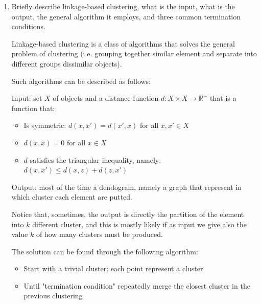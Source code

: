 \documentclass[a4paper,11pt,oneside]{book}
\begin{document}
\begin{enumerate}
\item Briefly describe linkage-based clustering, what is the input, what is the output, the general algorithm it employs, and three common termination conditions.
    \begin{solution}
        Linkage-based clustering is a class of algorithms that solves the general problem of clustering (i.e. grouping together similar element and separate into different groups dissimilar objects).
        
        Such algorithms can be described as follows:
        
        Input: set $X$ of objects and a distance function $d : X\times X \to \mathbb{R}^+$ that is a function that:
        \begin{itemize}
        \item Is symmetric: $d(x,x') = d(x',x)$ for all $x,x' \in X$
        \item $d(x,x) = 0$ for all $x \in X$
        \item $d$ satisfies the triangular inequality, namely: $d(x,x') \leq d(x,z) + d(z,x')$
        \end{itemize}
        
        Output: most of the time a dendogram, namely a graph that represent in which cluster each element are putted.
        
        Notice that, sometimes, the output is directly the partition of the element into $k$ different cluster, and this is mostly likely if as input we give also the value $k$ of how many clusters must be produced.
        
        The solution can be found through the following algorithm:
        \begin{itemize}
        \item Start with a trivial cluster: each point represent a cluster
        \item Until "termination condition" repeatedly merge the closest cluster in the previous clustering
        \end{itemize}
        

\end{solution}
\end{enumerate}
\end{document}
